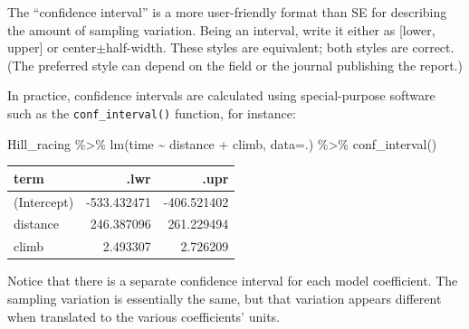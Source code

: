 \documentclass[
  letterpaper,
  DIV=11,
  numbers=noendperiod,
  oneside]{scrreprt}
\newenvironment{Shaded}{\begin{snugshade}}{\end{snugshade}}
\newcommand{\AttributeTok}[1]{\textcolor[rgb]{0.40,0.45,0.13}{#1}}
\newcommand{\FunctionTok}[1]{\textcolor[rgb]{0.28,0.35,0.67}{#1}}
\newcommand{\NormalTok}[1]{\textcolor[rgb]{0.00,0.23,0.31}{#1}}
\newcommand{\SpecialCharTok}[1]{\textcolor[rgb]{0.37,0.37,0.37}{#1}}
\begin{document}
The ``confidence interval'' is a more user-friendly format than SE for
describing the amount of sampling variation. Being an interval, write it
either as {[}lower, upper{]} or center\(\pm\)half-width. These styles
are equivalent; both styles are correct. (The preferred style can depend
on the field or the journal publishing the report.)

In practice, confidence intervals are calculated using special-purpose
software such as the \texttt{conf\_interval()} function, for instance:

\begin{Shaded}
\begin{Highlighting}[]
\NormalTok{Hill\_racing }\SpecialCharTok{\%\textgreater{}\%} 
  \FunctionTok{lm}\NormalTok{(time }\SpecialCharTok{\textasciitilde{}}\NormalTok{ distance }\SpecialCharTok{+}\NormalTok{ climb, }\AttributeTok{data=}\NormalTok{.) }\SpecialCharTok{\%\textgreater{}\%} 
  \FunctionTok{conf\_interval}\NormalTok{()}
\end{Highlighting}
\end{Shaded}

\ttfamily 
\begin{tabular}{lrr}
\toprule
term & .lwr & .upr\\
\midrule
(Intercept) & -533.432471 & -406.521402\\
distance & 246.387096 & 261.229494\\
climb & 2.493307 & 2.726209\\
\bottomrule
\end{tabular} \normalfont
\bigskip

Notice that there is a separate confidence interval for each model
coefficient. The sampling variation is essentially the same, but that
variation appears different when translated to the various coefficients'
units.
\end{document}

